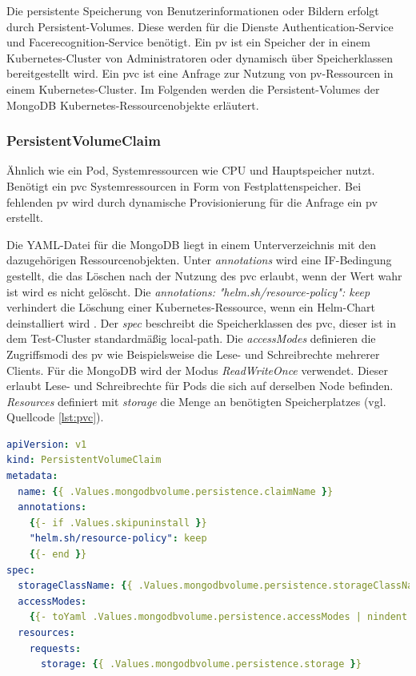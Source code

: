 Die persistente Speicherung von Benutzerinformationen oder Bildern erfolgt durch Persistent-Volumes.
Diese werden für die Dienste Authentication-Service und Facerecognition-Service benötigt.
Ein \ac{pv} ist ein Speicher der in einem Kubernetes-Cluster von Administratoren oder dynamisch über Speicherklassen bereitgestellt wird.
Ein \ac{pvc} ist eine Anfrage zur Nutzung von \acs{pv}-Ressourcen in einem Kubernetes-Cluster.
Im Folgenden werden die Persistent-Volumes der MongoDB Kubernetes-Ressourcenobjekte erläutert.


\subsubsection{PersistentVolumeClaim}

Ähnlich wie ein Pod, Systemressourcen wie CPU und Hauptspeicher nutzt.
Benötigt ein \acs{pvc} Systemressourcen in Form von Festplattenspeicher.
Bei fehlenden \acs{pv} wird durch dynamische Provisionierung für die Anfrage ein \acs{pv} erstellt.

Die YAML-Datei für die MongoDB liegt in einem Unterverzeichnis mit den dazugehörigen Ressourcenobjekten.
Unter \textit{annotations} wird eine IF-Bedingung gestellt, die das Löschen nach der Nutzung des \acs{pvc} erlaubt, wenn der Wert wahr ist wird es nicht gelöscht.
Die \textit{annotations: }\textit{"helm.sh/resource-policy": keep} verhindert die Löschung einer Kubernetes-Ressource, wenn ein Helm-Chart deinstalliert wird \cite{helmtipsandtricks}.
Der \textit{spec} beschreibt die Speicherklassen des \acs{pvc}, dieser ist in dem Test-Cluster standardmäßig local-path.
Die \textit{accessModes} definieren die Zugriffsmodi des \acs{pv} wie Beispielsweise die Lese- und Schreibrechte mehrerer Clients.
Für die MongoDB wird der Modus \textit{ReadWriteOnce} verwendet.
Dieser erlaubt Lese- und Schreibrechte für Pods die sich auf derselben Node befinden.
\textit{Resources} definiert mit \textit{storage} die Menge an benötigten Speicherplatzes (vgl. Quellcode \ref{lst:pvc}).

\begin{lstlisting}[caption={pvc-claim.yaml },captionpos=b,label={lst:pvc},language=yaml]
apiVersion: v1
kind: PersistentVolumeClaim
metadata:
  name: {{ .Values.mongodbvolume.persistence.claimName }}
  annotations:
    {{- if .Values.skipuninstall }}
    "helm.sh/resource-policy": keep
    {{- end }}
spec:
  storageClassName: {{ .Values.mongodbvolume.persistence.storageClassName }}
  accessModes:
    {{- toYaml .Values.mongodbvolume.persistence.accessModes | nindent 4  }}
  resources:
    requests:
      storage: {{ .Values.mongodbvolume.persistence.storage }}
\end{lstlisting}


